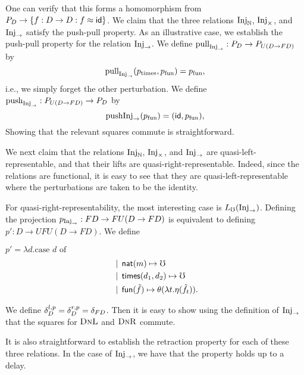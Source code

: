 One can verify that this forms a homomorphism from $P_D \to \{ f : D \to D : f \approx \mathsf{id} \}$.
We claim that the three relations $\text{Inj}_\mathbb{N}$, $\text{Inj}_\times$, and $\text{Inj}_\to$
satisfy the push-pull property.
As an illustrative case, we establish the push-pull property for the relation $\text{Inj}_\to$.
We define $\text{pull}_{\text{Inj}_\to} : P_D \to P_{U(D \to FD)}$ by
%
\[ \text{pull}_{\text{Inj}_\to}(p_{\text{times}}, p_{\text{fun}}) = p_{\text{fun}}, \]
%
i.e., we simply forget the other perturbation.
%
We define $\text{push}_{\text{Inj}_\to} : P_{U(D \to FD)} \to P_D$ by
%
\[ \text{push}{\text{Inj}_\to}(p_{\text{fun}}) = (\mathsf{id}, p_{\text{fun}}), \]
%
Showing that the relevant squares commute is straightforward.
%


We next claim that the relations $\text{Inj}_\mathbb{N}$, $\text{Inj}_\times$, and $\text{Inj}_\to$ are quasi-left-representable,
and that their lifts are quasi-right-representable.
Indeed, since the relations are functional, it is easy to see that they are quasi-left-representable
where the perturbations are taken to be the identity.

For quasi-right-representability, the most interesting case is $L_\mho(\text{Inj}_\to)$.
Defining the projection $p_{\text{Inj}_\to} : FD \to FU(D \to FD)$ is equivalent to defining
$p' : D \to UFU(D \to FD)$. We define

$p' = \lambda d.\text{case $d$ of}$
\begin{align*}
    &\mathrel{\bf \,\mid\,} \mathsf{nat}(m) \mapsto \mho \\
    &\mathrel{\bf \,\mid\,} \mathsf{times}(d_1, d_2) \mapsto \mho \\
    &\mathrel{\bf \,\mid\,} \mathsf{fun}(\tilde{f}) \mapsto \theta (\lambda t. \eta(\tilde{f}_t)).
\end{align*}

We define $\delta^{l,p}_D = \delta^{r,p}_D = \delta_{FD}$.
Then it is easy to show using the definition of $\text{Inj}_\to$ that the squares for $\textsc{DnL}$ and $\textsc{DnR}$ commute.

It is also straightforward to establish the retraction property for
each of these three relations. In the case of $\text{Inj}_\to$, we
have that the property holds up to a delay.

